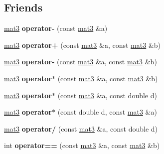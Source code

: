\subsection*{Friends}
\begin{DoxyCompactItemize}
\item 
\hypertarget{classmat3_afff00f7c04fb265f972104856a3f6927}{
\hyperlink{classmat3}{mat3} {\bfseries operator-\/} (const \hyperlink{classmat3}{mat3} \&a)}
\label{classmat3_afff00f7c04fb265f972104856a3f6927}

\item 
\hypertarget{classmat3_aa66b74a348e7f3a2082b28e2874f19db}{
\hyperlink{classmat3}{mat3} {\bfseries operator+} (const \hyperlink{classmat3}{mat3} \&a, const \hyperlink{classmat3}{mat3} \&b)}
\label{classmat3_aa66b74a348e7f3a2082b28e2874f19db}

\item 
\hypertarget{classmat3_a9b3993c4e22141d7e09b58b8d56a3cb2}{
\hyperlink{classmat3}{mat3} {\bfseries operator-\/} (const \hyperlink{classmat3}{mat3} \&a, const \hyperlink{classmat3}{mat3} \&b)}
\label{classmat3_a9b3993c4e22141d7e09b58b8d56a3cb2}

\item 
\hypertarget{classmat3_a0df0a7a0901cee5daec15003ee3594fc}{
\hyperlink{classmat3}{mat3} {\bfseries operator$\ast$} (const \hyperlink{classmat3}{mat3} \&a, const \hyperlink{classmat3}{mat3} \&b)}
\label{classmat3_a0df0a7a0901cee5daec15003ee3594fc}

\item 
\hypertarget{classmat3_a7d81495b02ac94a73917d5dd1a7a42d5}{
\hyperlink{classmat3}{mat3} {\bfseries operator$\ast$} (const \hyperlink{classmat3}{mat3} \&a, const double d)}
\label{classmat3_a7d81495b02ac94a73917d5dd1a7a42d5}

\item 
\hypertarget{classmat3_ae25b922aec58812f63eb8415d0fea703}{
\hyperlink{classmat3}{mat3} {\bfseries operator$\ast$} (const double d, const \hyperlink{classmat3}{mat3} \&a)}
\label{classmat3_ae25b922aec58812f63eb8415d0fea703}

\item 
\hypertarget{classmat3_a3db0205874131d4c2cdb31b5a12e67a0}{
\hyperlink{classmat3}{mat3} {\bfseries operator/} (const \hyperlink{classmat3}{mat3} \&a, const double d)}
\label{classmat3_a3db0205874131d4c2cdb31b5a12e67a0}

\item 
\hypertarget{classmat3_a3df45b66c3361260ebbc68da837a43bf}{
int {\bfseries operator==} (const \hyperlink{classmat3}{mat3} \&a, const \hyperlink{classmat3}{mat3} \&b)}
\label{classmat3_a3df45b66c3361260ebbc68da837a43bf}


\end{DoxyCompactItemize}
